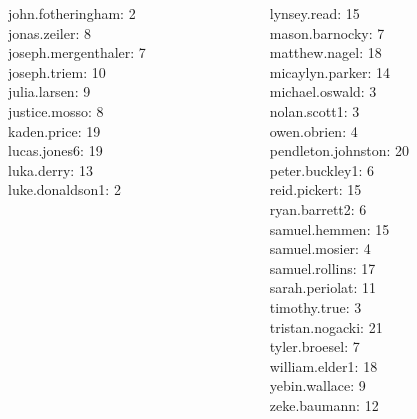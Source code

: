 \documentclass[10pt]{beamer}
\begin{document}
\begin{frame}
\begin{columns}
\begin{column}{0.33\textwidth}
john.fotheringham: 2 \\ 
jonas.zeiler: 8 \\ 
joseph.mergenthaler: 7 \\ 
joseph.triem: 10 \\ 
julia.larsen: 9 \\ 
justice.mosso: 8 \\ 
kaden.price: 19 \\ 
lucas.jones6: 19 \\ 
luka.derry: 13 \\ 
luke.donaldson1: 2 \\\end{column}
\begin{column}{0.33\textwidth}
lynsey.read: 15 \\ 
mason.barnocky: 7 \\ 
matthew.nagel: 18 \\ 
micaylyn.parker: 14 \\ 
michael.oswald: 3 \\ 
nolan.scott1: 3 \\ 
owen.obrien: 4 \\ 
pendleton.johnston: 20 \\ 
peter.buckley1: 6 \\ 
reid.pickert: 15 \\ 
ryan.barrett2: 6 \\ 
samuel.hemmen: 15 \\ 
samuel.mosier: 4 \\ 
samuel.rollins: 17 \\ 
sarah.periolat: 11 \\ 
timothy.true: 3 \\ 
tristan.nogacki: 21 \\ 
tyler.broesel: 7 \\ 
william.elder1: 18 \\ 
yebin.wallace: 9 \\ 
zeke.baumann: 12 \\\end{column}
\end{columns}
\vfill
\end{frame}
\end{document}
